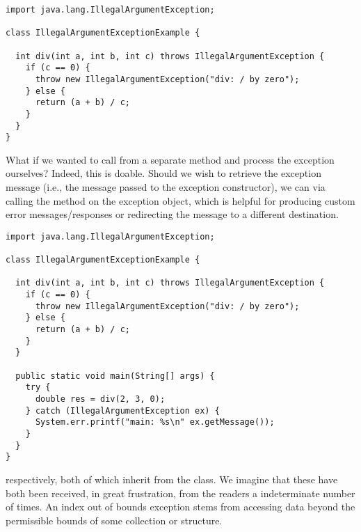 \begin{lstlisting}[language=MyJava]
import java.lang.IllegalArgumentException;

class IllegalArgumentExceptionExample {
  
  int div(int a, int b, int c) throws IllegalArgumentException {
    if (c == 0) { 
      throw new IllegalArgumentException("div: / by zero"); 
    } else { 
      return (a + b) / c; 
    }
  }
}
\end{lstlisting}

What if we wanted to call  from a separate method and process the exception ourselves? 
Indeed, this is doable. 
Should we wish to retrieve the exception message (i.e., the message passed to the exception constructor), we can via calling the  method on the exception object, which is helpful for producing custom error messages/responses or redirecting the message to a different destination.

\begin{lstlisting}[language=MyJava]
import java.lang.IllegalArgumentException;

class IllegalArgumentExceptionExample {
  
  int div(int a, int b, int c) throws IllegalArgumentException {
    if (c == 0) { 
      throw new IllegalArgumentException("div: / by zero"); 
    } else { 
      return (a + b) / c; 
    }
  }

  public static void main(String[] args) {
    try {
      double res = div(2, 3, 0);
    } catch (IllegalArgumentException ex) {
      System.err.printf("main: %s\n" ex.getMessage());
    }
  }
}
\end{lstlisting}

\newpage %
 respectively, both of which inherit from the  class. 
We imagine that these have both been received, in great frustration, from the readers a indeterminate number of times. 
An index out of bounds exception stems from accessing data beyond the permissible bounds of some collection or structure.

